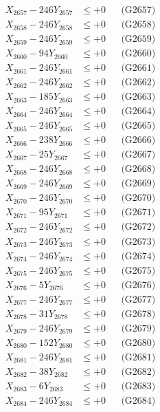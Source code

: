 \documentclass[a4paper,10pt]{article}
\begin{document}
{\begin{align}
X_{2657} - 246Y_{2657} &\leq +0 && \text{(G2657)} \\
X_{2658} - 246Y_{2658} &\leq +0 && \text{(G2658)} \\
X_{2659} - 246Y_{2659} &\leq +0 && \text{(G2659)} \\
X_{2660} - 94Y_{2660} &\leq +0 && \text{(G2660)} \\
\allowbreak
X_{2661} - 246Y_{2661} &\leq +0 && \text{(G2661)} \\
X_{2662} - 246Y_{2662} &\leq +0 && \text{(G2662)} \\
X_{2663} - 185Y_{2663} &\leq +0 && \text{(G2663)} \\
X_{2664} - 246Y_{2664} &\leq +0 && \text{(G2664)} \\
X_{2665} - 246Y_{2665} &\leq +0 && \text{(G2665)} \\
X_{2666} - 238Y_{2666} &\leq +0 && \text{(G2666)} \\
X_{2667} - 25Y_{2667} &\leq +0 && \text{(G2667)} \\
X_{2668} - 246Y_{2668} &\leq +0 && \text{(G2668)} \\
X_{2669} - 246Y_{2669} &\leq +0 && \text{(G2669)} \\
X_{2670} - 246Y_{2670} &\leq +0 && \text{(G2670)} \\
\allowbreak
X_{2671} - 95Y_{2671} &\leq +0 && \text{(G2671)} \\
X_{2672} - 246Y_{2672} &\leq +0 && \text{(G2672)} \\
X_{2673} - 246Y_{2673} &\leq +0 && \text{(G2673)} \\
X_{2674} - 246Y_{2674} &\leq +0 && \text{(G2674)} \\
X_{2675} - 246Y_{2675} &\leq +0 && \text{(G2675)} \\
X_{2676} - 5Y_{2676} &\leq +0 && \text{(G2676)} \\
X_{2677} - 246Y_{2677} &\leq +0 && \text{(G2677)} \\
X_{2678} - 31Y_{2678} &\leq +0 && \text{(G2678)} \\
X_{2679} - 246Y_{2679} &\leq +0 && \text{(G2679)} \\
X_{2680} - 152Y_{2680} &\leq +0 && \text{(G2680)} \\
\allowbreak
X_{2681} - 246Y_{2681} &\leq +0 && \text{(G2681)} \\
X_{2682} - 38Y_{2682} &\leq +0 && \text{(G2682)} \\
X_{2683} - 6Y_{2683} &\leq +0 && \text{(G2683)} \\
X_{2684} - 246Y_{2684} &\leq +0 && \text{(G2684)} \\

\end{align}}
\end{document}
